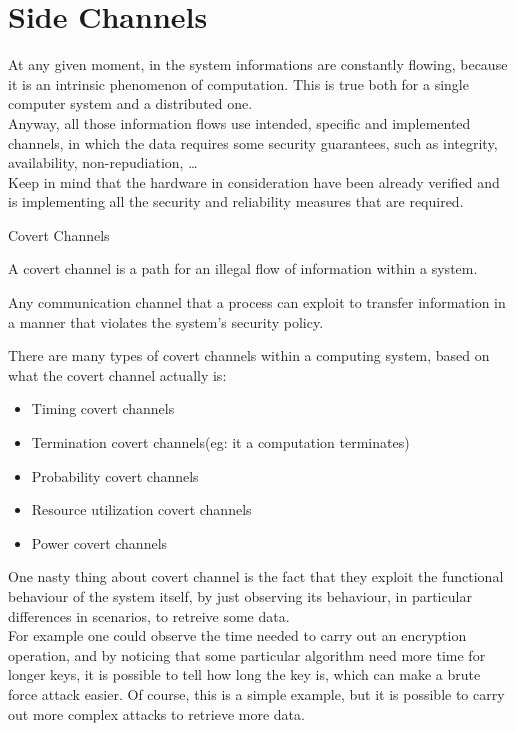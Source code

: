 \chapter{Side Channels}
At any given moment, in the system informations are constantly flowing, because
it is an intrinsic phenomenon of computation. This is true both for a single computer system and a
distributed one.\\
Anyway, all those information flows use intended, specific and implemented channels, in which the
data requires some security guarantees, such as integrity, availability, non-repudiation, \dots\\
Keep in mind that the hardware in consideration have been already verified  and is implementing all
the security and reliability measures that are required.
\begin{section}{Covert Channels}
  \begin{boxH}
    A covert channel is a path for an illegal flow of information within a system.
  \end{boxH}
  Any communication channel that a process can exploit to transfer information in a manner that
  violates the system’s security policy.

  There are many types of covert channels within a computing system, based on what the covert channel
  actually is:
  \begin{itemize}
    \item Timing covert channels
    \item Termination covert channels(eg: it a computation terminates)
    \item Probability covert channels
    \item Resource utilization covert channels
    \item Power covert channels
  \end{itemize}

  One nasty thing about covert channel is the fact that they exploit the functional behaviour of the
  system itself, by just observing its behaviour, in particular differences in scenarios, to
  retreive some data.\\
  For example one could observe the time needed to carry out an encryption operation, and by
  noticing that some particular algorithm need more time for longer keys, it is possible to 
  tell how long the key is, which can make a brute force attack easier. Of course, this is a
  simple example, but it is possible to carry out more complex attacks to retrieve more data.\\


\end{section}
